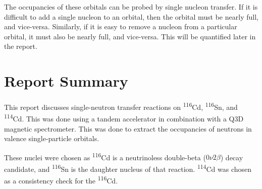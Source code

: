 The occupancies of these orbitals can be probed by single nucleon transfer. If it is difficult to add a single nucleon to an orbital, then the orbital must be nearly full, and vice-versa. Similarly, if it is easy to remove a nucleon from a particular orbital, it must also be nearly full, and vice-versa. This will be quantified later in the report.

\section{Report Summary}

This report discusses single-neutron transfer reactions on \textsuperscript{116}Cd, \textsuperscript{116}Sn, and \textsuperscript{114}Cd. This was done using a tandem accelerator in combination with a Q3D magnetic spectrometer. This was done to extract the occupancies of neutrons in valence single-particle orbitals.

These nuclei were chosen as \textsuperscript{116}Cd is a neutrinoless double-beta ($0\nu2\beta$) decay candidate, and \textsuperscript{116}Sn is the daughter nucleus of that reaction. \textsuperscript{114}Cd was chosen as a consistency check for the \textsuperscript{116}Cd.